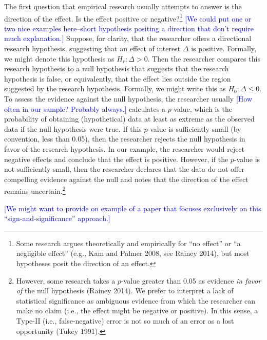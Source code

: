\documentclass[12pt]{article}
\newcommand{\kelly}[1]{\textcolor{blue}{#1}}
\begin{document}
The first question that empirical research usually attempts to answer is the direction of the effect. Is the effect positive or negative?\footnote{Some research argues theoretically and empirically for ``no effect'' or ``a negligible effect'' (e.g., Kam and Palmer 2008, see Rainey 2014), but most hypotheses posit the direction of an effect.} \kelly{[We could put one or two nice examples here--short hypothesis positing a direction that don't require much explanation.]} Suppose, for clarity, that the researcher offers a directional research hypothesis, suggesting that an effect of interest $\Delta$ is positive. Formally, we might denote this hypothesis as $H_r: \Delta > 0$. Then the researcher compares this research hypothesis to a null hypothesis that suggests that the research hypothesis is false, or equivalently, that the effect lies outside the region suggested by the research hypothesis. Formally, we might write this as $H_0: \Delta \leq 0$. To assess the evidence against the null hypothesis, the researcher usually \kelly{[How often in our sample? Probably always.]} calculates a $p$-value, which is the probability of obtaining (hypothetical) data at least as extreme as the observed data if the null hypothesis were true. If this $p$-value is sufficiently small (by convention, less than 0.05), then the researcher rejects the null hypothesis in favor of the research hypothesis. In our example, the researcher would reject negative effects and conclude that the effect is positive. However, if the $p$-value is not sufficiently small, then the researcher declares that the data do not offer compelling evidence against the null and notes that the direction of the effect remains uncertain.\footnote{However, some research takes a $p$-value greater than 0.05 as evidence \textit{in favor of} the null hypothesis (Rainey 2014). We prefer to interpret a lack of statistical significance as ambiguous evidence from which the researcher can make no claim (i.e., the effect might be negative or positive). In this sense, a Type-II (i.e., false-negative) error is not so much of an error as a lost opportunity (Tukey 1991).}

\kelly{[We might want to provide on example of a paper that focuses exclusively on this ``sign-and-significance'' approach.]}
\end{document}
